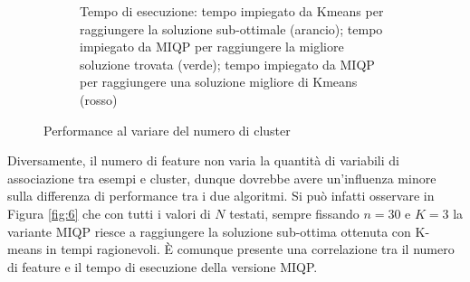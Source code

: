 \documentclass{article}
\begin{document}
\begin{figure}[H]
\begin{subfigure}[t]{0.49\linewidth}
         \caption{Tempo di esecuzione: tempo impiegato da Kmeans per raggiungere la soluzione sub-ottimale (arancio); tempo impiegato da MIQP per raggiungere la migliore soluzione trovata (verde); tempo impiegato da MIQP per raggiungere una soluzione migliore di Kmeans (rosso)}
     \end{subfigure}
        \label{fig:5}
        \caption{Performance al variare del numero di cluster}
     \end{figure}
    Diversamente, il numero di feature non varia la quantità di variabili di associazione tra esempi e cluster, dunque dovrebbe avere un'influenza minore sulla differenza di performance tra i due algoritmi. Si può infatti osservare in Figura \ref{fig:6} che con tutti i valori di $N$ testati, sempre fissando $n=30$ e $K=3$ la variante MIQP riesce a raggiungere la soluzione sub-ottima ottenuta con K-means in tempi ragionevoli. È comunque presente una correlazione tra il numero di feature e il tempo di esecuzione della versione MIQP.\\
\end{document}
